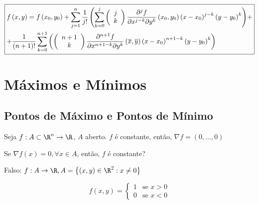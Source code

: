 \documentclass{book}
\begin{document}
\[\boxed{
\begin{gathered}
  f\left( {x,y} \right) = f\left( {x_0 ,y_0 } \right) + \sum\limits_{j = 1}^n {\frac{1}
{{j!}}\left( {\sum\limits_{k = 0}^j {\left( {\begin{array}{*{20}c}
j  \\
k  \\

\end{array} } \right)\frac{{\partial ^j f}}
{{\partial x^{j - k} \partial y^k }}\left( {x_0 ,y_0 } \right)\left( {x - x_0 } \right)^{j - k} \left( {y - y_0 } \right)^k } } \right)}  +  \hfill \\
+ \frac{1}
{{\left( {n + 1} \right)!}}\sum\limits_{k = 0}^{n + 1} {\left( {\left( {\begin{array}{*{20}c}
{n + 1}  \\
k  \\

\end{array} } \right)\frac{{\partial ^{n + 1} f}}
{{\partial x^{n + 1 - k} \partial y^k }}\left( {\overline x ,\overline y } \right)\left( {x - x_0 } \right)^{n + 1 - k} \left( {y - y_0 } \right)^k } \right)}  \hfill \\
\end{gathered}
}\]


\chapter{M\'aximos e M\'inimos} \label{chap04}

\section{Pontos de M\'aximo e Pontos de M\'inimo} \label{sec20}

Seja $f:A \subset \R^n \to \R$, $A$ aberto. $f$ \'e constante, ent\~ao, $\nabla f = \left( {0,...,0} \right)$

Se $\nabla f(x) = 0, \forall x \in A$, ent\~ao, $f$ \'e constante?

Falso: $f:A \to \R, A = \left\{ {\left( {x,y} \right) \in \R^2 :x \ne 0} \right\}$

\begin{equation*}
f(x,y)=\left\{ \begin{array}{cl}\displaystyle
1 & \textrm{se } x > 0\\
0 & \textrm{se } x< 0 \end{array}\right.
\end{equation*}
\end{document}
